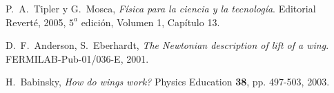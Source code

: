 \documentclass[11pt]{articulo}
\begin{document}

\begin{thebibliography}{X}

P.~A.~Tipler y G.~Mosca,
\textit{F\'isica para la ciencia y la tecnolog\'ia}. 
Editorial Revert\'e, 2005, $5^{a}$ edici\'on, Volumen 1, Cap\'itulo 13.

D.~F.~Anderson, S.~Eberhardt,
\textit{The Newtonian description of lift of a wing}.
FERMILAB-Pub-01/036-E, 2001.

H.~Babinsky,
{\it How do wings work?}
Physics Education {\bf 38}, pp. 497-503, 2003.

\end{thebibliography}


\end{document}
